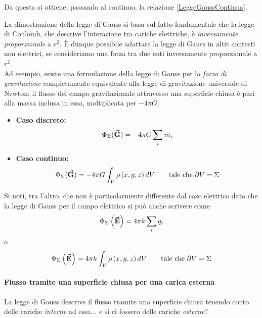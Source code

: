 Da questa si ottiene, passando al continuo, la relazione \ref{LeggeGaussContinua}.
\begin{observe}\label{LeggeGaussMoltoGeneralizzata}
	La dimostrazione della legge di Gauss si basa sul fatto fondamentale che la legge di Coulomb, che descrive l'interazione tra cariche elettriche, è \textit{inversamente proporzionale} a $r^2$. È dunque possibile adattare la legge di Gauss in altri contesti non elettrici, se consideriamo una forza tra due enti inversamente proporzionale a $r^2$.\\
	Ad esempio, esiste una formulazione della legge di Gauss per la \textit{forza di gravitazione} completamente equivalente alla legge di gravitazione universale di Newton: il flusso del campo gravitazionale attraverso una superficie chiusa è pari alla massa inclusa in essa, moltiplicata per $-4\pi G$.
	\begin{itemize}
		\item \textbf{Caso discreto:}
		\begin{equation}
			\Phi_\Sigma(\vb*{\va{G}})=-4\pi G\sum_i m_i
		\end{equation}
		\item \textbf{Caso continuo:}
		\begin{equation}
			\Phi_\Sigma(\vb*{\va{G}})=-4\pi G\int_{V}\rho\left(x,y,z\right)dV\qquad\text{tale che}\ \partial V=\Sigma
		\end{equation}
	\end{itemize}
	Si noti, tra l'altro, che non è particolarmente differente dal caso elettrico dato che la legge di Gauss per il campo elettrico si può anche scrivere come \begin{equation*}
		\Phi_\Sigma\left(\vb*{\va{E}}\right)=4\pi k\sum_i q_i
	\end{equation*}
	o
	\begin{equation}
		\Phi_\Sigma\left(\vb*{\va{E}}\right)=4\pi k\int_{V}\rho\left(x,y,z\right)dV\qquad\text{tale che}\ \partial V=\Sigma
	\end{equation}
\end{observe}
\paragraph{Flusso tramite una superficie chiusa per una carica esterna}
La legge di Gauss descrive il flusso tramite una superficie chiusa tenendo conto delle cariche \textit{interne} ad essa... e si ci fossero delle cariche \textit{esterne}?

